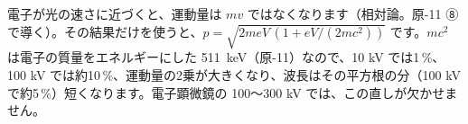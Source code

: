 \begin{seikaku}
電子が光の速さに近づくと、運動量は $mv$ ではなくなります（相対論。原-11 ⑧で導く）。その結果だけを使うと、$p=\sqrt{2meV\,(1+eV/(2mc^2))}$ です。$mc^2$ は電子の質量をエネルギーにした \qty{511}{keV}（原-11）なので、10 kV では1\,\%、100 kV では約10\,\%、運動量の2乗が大きくなり、波長はその平方根の分（100 kV で約5\,\%）短くなります。電子顕微鏡の 100〜300 kV では、この直しが欠かせません。
\end{seikaku}

\begin{phmodel}[電子の平面波]
\end{phmodel}


